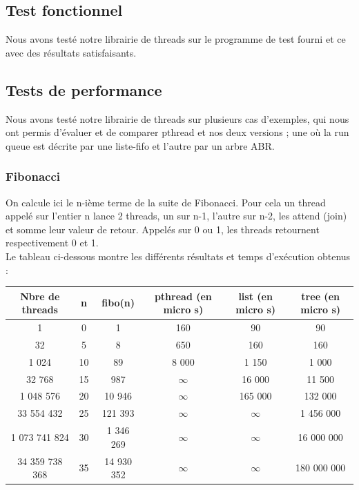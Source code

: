 \subsection{Test fonctionnel}

Nous avons testé notre librairie de threads sur le programme de test
fourni et ce avec des résultats satisfaisants.

\subsection{Tests de performance}

Nous avons testé notre librairie de threads sur plusieurs cas
d'exemples, qui nous ont permis d'évaluer et de comparer pthread et
nos deux versions ; une où la run queue est décrite par une liste-fifo
et l'autre par un arbre ABR.

\subsubsection{Fibonacci}
On calcule ici le n-ième terme de la suite de Fibonacci. Pour cela un
thread appelé sur l'entier n lance 2 threads, un sur n-1, l'autre sur
n-2, les attend (join) et somme leur valeur de retour. Appelés sur 0
ou 1, les threads retournent respectivement 0 et 1.\\

Le tableau ci-dessous montre les différents résultats et temps d'exécution obtenus : \\
\begin{tabular}{|c|c|c|c|c|c|}
  \hline
  Nbre de threads & n & fibo(n)  & pthread (en micro s) & list (en micro s) & tree (en micro s)\\
  \hline
  1              & 0  & 1          &  160   & 90      & 90           \\
  32             & 5  & 8          &  650   & 160     & 160          \\
  1 024          & 10 & 89         &  8 000 & 1 150   & 1 000        \\
  32 768         & 15 & 987        &   $\infty$ & 16 000  & 11 500       \\ 
  1 048 576      & 20 & 10 946     &   $\infty$     & 165 000 & 132 000      \\
  33 554 432     & 25 & 121 393    &  $\infty$      &     $\infty$    & 1 456 000    \\
  1 073 741 824  & 30 & 1 346 269  &    $\infty$    &      $\infty$   & 16 000 000   \\
  34 359 738 368 & 35 & 14 930 352 &     $\infty$   & $\infty$        & 180 000 000  \\
\hline
\end{tabular}

